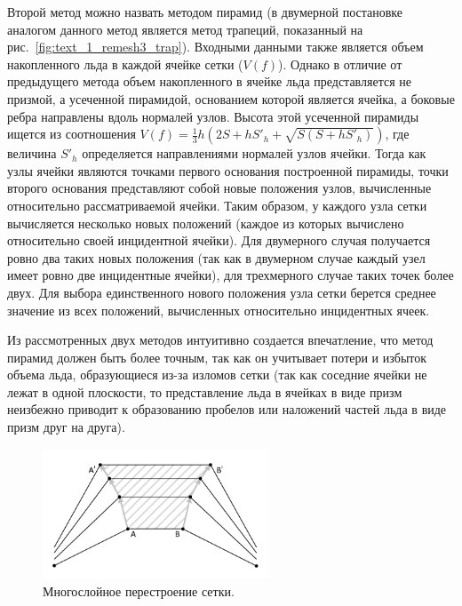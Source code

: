 Второй метод можно назвать методом пирамид (в двумерной постановке аналогом данного метод является метод трапеций, показанный на рис.~\ref{fig:text_1_remesh3_trap}).
Входными данными также является объем накопленного льда в каждой ячейке сетки ($V(f)$).
Однако в отличие от предыдущего метода объем накопленного в ячейке льда представляется не призмой, а усеченной пирамидой, основанием которой является ячейка, а боковые ребра направлены вдоль нормалей узлов.
Высота этой усеченной пирамиды ищется из соотношения $V(f) = \frac{1}{3} h (2S + hS'_h + \sqrt{S(S + hS'_h)})$, где величина $S'_h$ определяется направлениями нормалей узлов ячейки.
Тогда как узлы ячейки являются точками первого основания построенной пирамиды, точки второго основания представляют собой новые положения узлов, вычисленные относительно рассматриваемой ячейки.
Таким образом, у каждого узла сетки вычисляется несколько новых положений (каждое из которых вычислено относительно своей инцидентной ячейки).
Для двумерного случая получается ровно два таких новых положения (так как в двумерном случае каждый узел имеет ровно две инцидентные ячейки), для трехмерного случае таких точек более двух.
Для выбора единственного нового положения узла сетки берется среднее значение из всех положений, вычисленных относительно инцидентных ячеек.

Из рассмотренных двух методов интуитивно создается впечатление, что метод пирамид должен быть более точным, так как он учитывает потери и избыток объема льда, образующиеся из-за изломов сетки (так как соседние ячейки не лежат в одной плоскости, то представление льда в ячейках в виде призм неизбежно приводит к образованию пробелов или наложений частей льда в виде призм друг на друга).

\begin{figure}[ht]
\centering
\includegraphics[width=0.6\textwidth]{pics/text_1_remesh_3d/pic_classical_methods_multilayer.pdf}
\caption{Многослойное перестроение сетки.}
\label{fig:text_1_remesh3_multi}
\end{figure}

